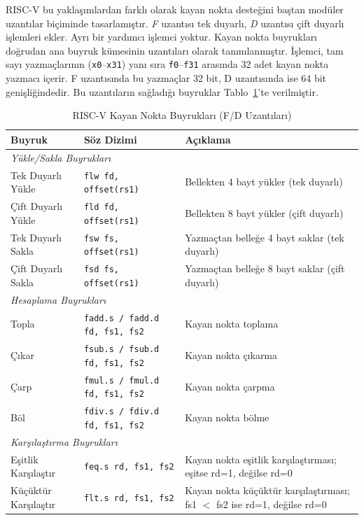 RISC-V bu yaklaşımlardan farklı olarak kayan nokta desteğini baştan modüler uzantılar biçiminde tasarlamıştır. \emph{F} uzantısı tek duyarlı, \emph{D} uzantısı çift duyarlı işlemleri ekler. Ayrı bir yardımcı işlemci yoktur. Kayan nokta buyrukları doğrudan ana buyruk kümesinin uzantıları olarak tanımlanmıştır. İşlemci, tam sayı yazmaçlarının (\texttt{x0}--\texttt{x31}) yanı sıra \texttt{f0}--\texttt{f31} arasında 32 adet kayan nokta yazmacı içerir. F uzantısında bu yazmaçlar 32 bit, D uzantısında ise 64 bit genişliğindedir. Bu uzantıların sağladığı buyruklar Tablo~\ref{tab:kayan-nokta-buyruklar}'te verilmiştir.

\begin{table}[htbp]
\centering
\caption{RISC-V Kayan Nokta Buyrukları (F/D Uzantıları)}
\label{tab:kayan-nokta-buyruklar}
\small
\begin{tabularx}{\textwidth}{l l X}
\toprule
\textbf{Buyruk} & \textbf{Söz Dizimi} & \textbf{Açıklama} \\
\midrule
\multicolumn{3}{l}{\textit{Yükle/Sakla Buyrukları}} \\
\midrule
Tek Duyarlı Yükle & \texttt{flw fd, offset(rs1)} & Bellekten 4 bayt yükler (tek duyarlı) \\
Çift Duyarlı Yükle & \texttt{fld fd, offset(rs1)} & Bellekten 8 bayt yükler (çift duyarlı) \\
Tek Duyarlı Sakla & \texttt{fsw fs, offset(rs1)} & Yazmaçtan belleğe 4 bayt saklar (tek duyarlı) \\
Çift Duyarlı Sakla & \texttt{fsd fs, offset(rs1)} & Yazmaçtan belleğe 8 bayt saklar (çift duyarlı) \\
\midrule
\multicolumn{3}{l}{\textit{Hesaplama Buyrukları}} \\
\midrule
Topla & \texttt{fadd.s / fadd.d fd, fs1, fs2} & Kayan nokta toplama \\
Çıkar & \texttt{fsub.s / fsub.d fd, fs1, fs2} & Kayan nokta çıkarma \\
Çarp & \texttt{fmul.s / fmul.d fd, fs1, fs2} & Kayan nokta çarpma \\
Böl & \texttt{fdiv.s / fdiv.d fd, fs1, fs2} & Kayan nokta bölme \\
\midrule
\multicolumn{3}{l}{\textit{Karşılaştırma Buyrukları}} \\
\midrule
Eşitlik Karşılaştır & \texttt{feq.s rd, fs1, fs2} & Kayan nokta eşitlik karşılaştırması; eşitse rd=1, değilse rd=0 \\
Küçüktür Karşılaştır & \texttt{flt.s rd, fs1, fs2} & Kayan nokta küçüktür karşılaştırması; fs1 $<$ fs2 ise rd=1, değilse rd=0 \\

\end{tabularx}
\end{table}
